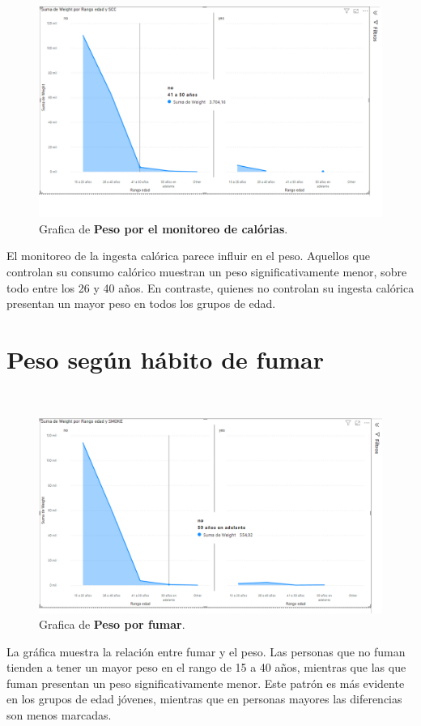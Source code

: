 \documentclass[a4paper]{report} %
\begin{document}
\paragraph{}\mbox{} \\
\begin{figure}[htb]
                \centering
                  \includegraphics[width=\textwidth]{Images/pesopormonitoreocalorias.png}
                  \caption{Grafica de \textbf{Peso por el monitoreo de calórias}.}
              \end{figure} 
El monitoreo de la ingesta calórica parece influir en el peso. Aquellos que controlan su consumo calórico muestran un peso significativamente menor, sobre todo entre los 26 y 40 años. En contraste, quienes no controlan su ingesta calórica presentan un mayor peso en todos los grupos de edad.
\section{Peso según hábito de fumar}
\paragraph{}\mbox{} \\
\begin{figure}[htb]
                \centering
                  \includegraphics[width=\textwidth]{Images/pesoporfumar.png}
                  \caption{Grafica de \textbf{Peso por fumar}.}
              \end{figure} 
La gráfica muestra la relación entre fumar y el peso. Las personas que no fuman tienden a tener un mayor peso en el rango de 15 a 40 años, mientras que las que fuman presentan un peso significativamente menor. Este patrón es más evidente en los grupos de edad jóvenes, mientras que en personas mayores las diferencias son menos marcadas.
\end{document}
